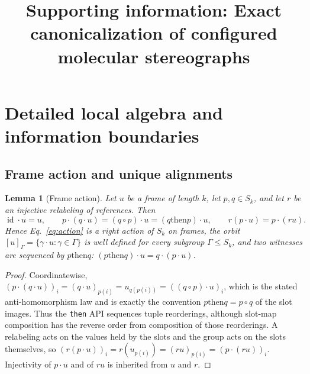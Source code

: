 \documentclass[pdflatex,sn-mathphys-num,referee,lineno]{sn-jnl}
\newcommand{\code}[1]{\texttt{#1}}
\theoremstyle{plain}
\newtheorem{lemma}[theorem]{Lemma}
\theoremstyle{remark}
\theoremstyle{definition}
\begin{document}
\title{Supporting information: Exact canonicalization of configured molecular stereographs}

\maketitle
\appendix
\renewcommand{\thetheorem}{S\arabic{theorem}}
\renewcommand{\theequation}{S\arabic{equation}}
\renewcommand{\thefigure}{S\arabic{figure}}
\renewcommand{\thetable}{S\arabic{table}}
\renewcommand{\thealgorithm}{S\arabic{algorithm}}

\section{Detailed local algebra and information boundaries}
\label{sec:detailed-algebra}

\subsection{Frame action and unique alignments}
\begin{lemma}[Frame action]
\label{lem:frame-action}
Let \(u\) be a frame of length \(k\), let \(p,q\in S_k\), and let \(r\) be an
injective relabeling of references.  Then
\[
  \operatorname{id}\cdot u=u,
  \qquad
  p\cdot(q\cdot u)=(q\circ p)\cdot u
  =(q\mathbin{\mathrm{then}}p)\cdot u,
  \qquad
  r(p\cdot u)=p\cdot(ru).
\]
Hence Eq.~\eqref{eq:action} is a right action of \(S_k\) on frames, the orbit
\([u]_\Gamma=\{\gamma\cdot u:\gamma\in\Gamma\}\) is well defined for every
subgroup \(\Gamma\leq S_k\), and two witnesses are sequenced by
\(p\mathbin{\mathrm{then}}q\):
\((p\mathbin{\mathrm{then}}q)\cdot u=q\cdot(p\cdot u)\).
\end{lemma}

\begin{proof}
Coordinatewise,
\((p\cdot(q\cdot u))_i=(q\cdot u)_{p(i)}=u_{q(p(i))}=((q\circ p)\cdot u)_i\),
which is the stated anti-homomorphism law and is exactly the convention
\(p\mathbin{\mathrm{then}}q=p\circ q\) of the slot images.  Thus the
\code{then} API sequences tuple reorderings, although slot-map composition
has the reverse order from composition of those reorderings.  A relabeling acts on the values held by
the slots and the group acts on the slots themselves, so
\((r(p\cdot u))_i=r(u_{p(i)})=(ru)_{p(i)}=(p\cdot(ru))_i\).  Injectivity of
\(p\cdot u\) and of \(ru\) is inherited from \(u\) and \(r\).
\end{proof}
\end{document}

